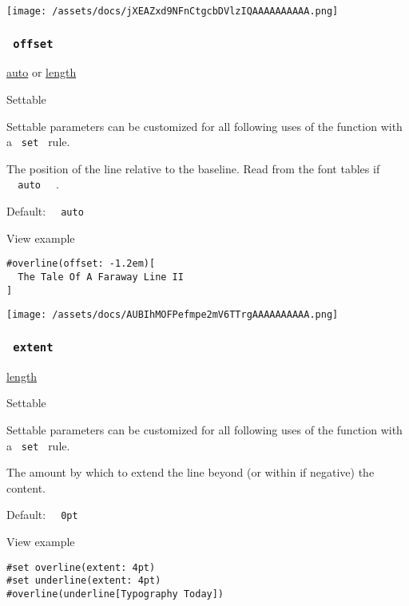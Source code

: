 \texttt{[image: /assets/docs/jXEAZxd9NFnCtgcbDVlzIQAAAAAAAAAA.png]}

\subsubsection{\texorpdfstring{\texttt{\ offset\ }}{ offset }}\label{parameters-offset}

\href{/docs/reference/foundations/auto/}{auto} {or}
\href{/docs/reference/layout/length/}{length}

{{ Settable }}

\label{parameters-offset-settable-tooltip}
Settable parameters can be customized for all following uses of the
function with a \texttt{\ set\ } rule.

The position of the line relative to the baseline. Read from the font
tables if \texttt{\ }{\texttt{\ auto\ }}\texttt{\ } .

Default: \texttt{\ }{\texttt{\ auto\ }}\texttt{\ }


View example

\begin{verbatim}
#overline(offset: -1.2em)[
  The Tale Of A Faraway Line II
]
\end{verbatim}

\texttt{[image: /assets/docs/AUBIhMOFPefmpe2mV6TTrgAAAAAAAAAA.png]}

\subsubsection{\texorpdfstring{\texttt{\ extent\ }}{ extent }}\label{parameters-extent}

\href{/docs/reference/layout/length/}{length}

{{ Settable }}

\label{parameters-extent-settable-tooltip}
Settable parameters can be customized for all following uses of the
function with a \texttt{\ set\ } rule.

The amount by which to extend the line beyond (or within if negative)
the content.

Default: \texttt{\ }{\texttt{\ 0pt\ }}\texttt{\ }


View example

\begin{verbatim}
#set overline(extent: 4pt)
#set underline(extent: 4pt)
#overline(underline[Typography Today])
\end{verbatim}

